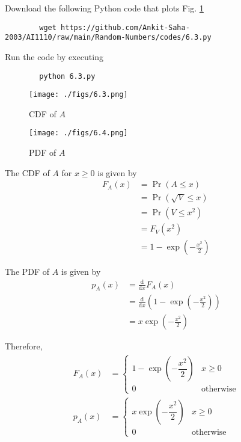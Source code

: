 \documentclass[journal,12pt,twocolumn]{IEEEtran}
\providecommand{\pr}[1]{\ensuremath{\Pr\left(#1\right)}}
\providecommand{\brak}[1]{\ensuremath{\left(#1\right)}}
\providecommand{\der}[1]{\mathrm{d} #1}
\numberwithin{equation}{section}
\renewcommand\thesection{\arabic{section}}
\begin{document}
\begin{enumerate}[label=\thesection.\arabic*,ref=\thesection.\theenumi]
	Download the following Python code that plots Fig. \ref{fig-6.3} 
	\begin{lstlisting}
		wget https://github.com/Ankit-Saha-2003/AI1110/raw/main/Random-Numbers/codes/6.3.py
	\end{lstlisting}
	Run the code by executing
	\begin{lstlisting}
		python 6.3.py
	\end{lstlisting}
	\begin{figure}
		\centering
		\texttt{[image: ./figs/6.3.png]}
		\caption{CDF of $A$}
		\label{fig-6.3}
	\end{figure}
	\begin{figure}
		\centering
		\texttt{[image: ./figs/6.4.png]}
		\caption{PDF of $A$}
		\label{fig-6.4}
	\end{figure}
	
	The CDF of $A$ for $x \ge 0$ is given by
	\begin{align}
		F_A(x) &= \pr{A \le x} \\
		&= \pr{\sqrt{V} \le x} \\
		&= \pr{V \le x^2} \\
		&= F_V(x^2) \\
		&= 1 - \exp\brak{-\frac{x^2}{2}}
	\end{align}
	
	The PDF of $A$ is given by
	\begin{align}
		p_A(x) &= \frac{\der{}}{\der{x}} F_A(x) \\
		&= \frac{\der{}}{\der{x}} \brak{1 - \exp\brak{-\frac{x^2}{2}}} \\
		&= x \exp\brak{-\frac{x^2}{2}}
	\end{align}
	
	Therefore,
	\begin{align}
		F_A(x) &= 
		\begin{cases}
			1 - \exp\brak{-\dfrac{x^2}{2}} & x \geq 0 \\
			0 & \text{otherwise}
		\end{cases}	\\
		p_A(x) &= 
		\begin{cases}
			x \exp\brak{-\dfrac{x^2}{2}} & x \geq 0 \\
			0 & \text{otherwise}
		\end{cases}
	\end{align}
	
	\end{enumerate}
	
\end{document}
